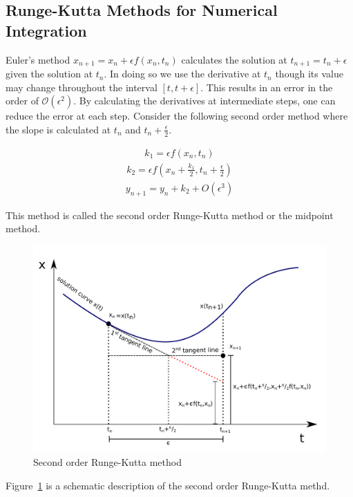 \documentclass[10pt,letterpaper]{article}
\begin{document}
\subsection*{Runge-Kutta Methods for Numerical Integration}

Euler's method $x_{n+1}=x_n + \epsilon f(x_n,t_n)$ calculates the solution at $t_{n+1}=t_n+\epsilon$ given the solution at $t_n$. In doing so we use the derivative at $t_{n}$ though its value may change throughout the interval $[t,t+\epsilon]$.  This results in an error in the order of $\mathcal{O}(\epsilon^2)$. By calculating the derivatives at intermediate steps, one can reduce the error at each step. Consider the following second order method where the slope is calculated at $t_{n}$ and $t_n+\frac{\epsilon}{2}$.

\begin{eqnarray}k_1=\epsilon f(x_n,t_n)\end{eqnarray}
\begin{eqnarray}k_2=\epsilon f(x_n+\frac{k_1}{2},t_n+\frac{\epsilon}{2})\end{eqnarray}
\begin{eqnarray}y_{n+1}=y_n+k_2+O(\epsilon^3)\end{eqnarray}


This method is called the second order Runge-Kutta method or the midpoint method.
\begin{figure}
\includegraphics[scale=0.4]{Figures/fig4.pdf} 
\caption{Second order Runge-Kutta method}
\label{fig:RK2}
\end{figure}
Figure~\ref{fig:RK2} is a schematic description of the second order Runge-Kutta methd. 
\end{document}
